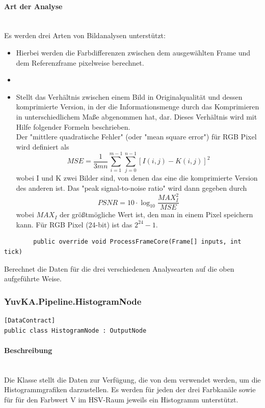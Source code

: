 \begin{itemize}
	\paragraph{Art der Analyse}~\\ Es werden drei Arten von Bildanalysen unterstützt: 
		\begin{itemize}
			\item {} Hierbei werden die Farbdifferenzen zwischen dem ausgewählten Frame und dem Referenzframe pixelweise berechnet.
			\item {}
			\item {} Stellt das Verhältnis zwischen einem Bild in Originalqualität und dessen komprimierte Version, in der die Informationsmenge durch das Komprimieren in unterschiedlichem Maße abgenommen hat, dar. Dieses Verhältnis wird mit Hilfe folgender Formeln beschrieben. \\
			Der "mittlere quadratische Fehler" (oder "mean square error") für RGB Pixel wird definiert als 
			\[ MSE = \frac{1}{3mn} \sum_{i = 1}^{m - 1}{ \sum_{j = 0}^{n - 1}{[I(i, j) - K(i, j)]^2} } \]
			wobei I und K zwei Bilder sind, von denen das eine die komprimierte Version des anderen ist. Das "peak signal-to-noise ratio" wird dann gegeben durch
			\[ PSNR = 10 \cdot \log_{10}{\frac{MAX_I^2}{MSE}} \]
			wobei $ MAX_I $ der größtmögliche Wert ist, den man in einem Pixel speichern kann. Für RGB Pixel (24-bit) ist das $ 2^{24} - 1 $.
		\end{itemize}
	
	\begin{verbatim}
		public override void ProcessFrameCore(Frame[] inputs, int tick)
	\end{verbatim}
	Berechnet die Daten für die drei verschiedenen Analysearten auf die oben aufgeführte Weise.
	
	
\end{itemize}


\subsubsection{YuvKA.Pipeline.HistogramNode}

\begin{verbatim}
[DataContract]
public class HistogramNode : OutputNode
\end{verbatim}
\paragraph{Beschreibung}~\\
Die Klasse  stellt die Daten zur Verfügung, die von dem  verwendet werden, um die Histogrammgrafiken darzustellen. Es werden für jeden der drei Farbkanäle sowie für für den Farbwert V im HSV-Raum jeweils ein Histogramm unterstützt.

